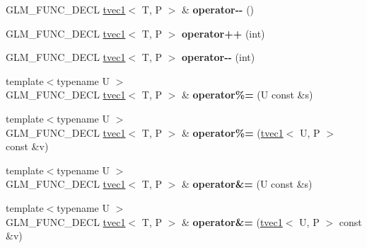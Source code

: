 \begin{DoxyCompactItemize}
\item 
G\+L\+M\+\_\+\+F\+U\+N\+C\+\_\+\+D\+E\+CL \hyperlink{structglm_1_1detail_1_1tvec1}{tvec1}$<$ T, P $>$ \& {\bfseries operator-\/-\/} ()\hypertarget{structglm_1_1detail_1_1tvec1_a777ac8b6fe013405c6015d518a2096a6}{}\label{structglm_1_1detail_1_1tvec1_a777ac8b6fe013405c6015d518a2096a6}

\item 
G\+L\+M\+\_\+\+F\+U\+N\+C\+\_\+\+D\+E\+CL \hyperlink{structglm_1_1detail_1_1tvec1}{tvec1}$<$ T, P $>$ {\bfseries operator++} (int)\hypertarget{structglm_1_1detail_1_1tvec1_a215f0e9af490b7cfce0639fc34e67df7}{}\label{structglm_1_1detail_1_1tvec1_a215f0e9af490b7cfce0639fc34e67df7}

\item 
G\+L\+M\+\_\+\+F\+U\+N\+C\+\_\+\+D\+E\+CL \hyperlink{structglm_1_1detail_1_1tvec1}{tvec1}$<$ T, P $>$ {\bfseries operator-\/-\/} (int)\hypertarget{structglm_1_1detail_1_1tvec1_a6fab4adec100e472d3b3d7da65ef2053}{}\label{structglm_1_1detail_1_1tvec1_a6fab4adec100e472d3b3d7da65ef2053}

\item 
{\footnotesize template$<$typename U $>$ }\\G\+L\+M\+\_\+\+F\+U\+N\+C\+\_\+\+D\+E\+CL \hyperlink{structglm_1_1detail_1_1tvec1}{tvec1}$<$ T, P $>$ \& {\bfseries operator\%=} (U const \&s)\hypertarget{structglm_1_1detail_1_1tvec1_a744a1362b6f4f9814ac695f7790b3fbf}{}\label{structglm_1_1detail_1_1tvec1_a744a1362b6f4f9814ac695f7790b3fbf}

\item 
{\footnotesize template$<$typename U $>$ }\\G\+L\+M\+\_\+\+F\+U\+N\+C\+\_\+\+D\+E\+CL \hyperlink{structglm_1_1detail_1_1tvec1}{tvec1}$<$ T, P $>$ \& {\bfseries operator\%=} (\hyperlink{structglm_1_1detail_1_1tvec1}{tvec1}$<$ U, P $>$ const \&v)\hypertarget{structglm_1_1detail_1_1tvec1_a99b8f92366abc26677caf3ad5befb4a2}{}\label{structglm_1_1detail_1_1tvec1_a99b8f92366abc26677caf3ad5befb4a2}

\item 
{\footnotesize template$<$typename U $>$ }\\G\+L\+M\+\_\+\+F\+U\+N\+C\+\_\+\+D\+E\+CL \hyperlink{structglm_1_1detail_1_1tvec1}{tvec1}$<$ T, P $>$ \& {\bfseries operator\&=} (U const \&s)\hypertarget{structglm_1_1detail_1_1tvec1_a641b0025753046a3c2b3c8020cf7d4aa}{}\label{structglm_1_1detail_1_1tvec1_a641b0025753046a3c2b3c8020cf7d4aa}

\item 
{\footnotesize template$<$typename U $>$ }\\G\+L\+M\+\_\+\+F\+U\+N\+C\+\_\+\+D\+E\+CL \hyperlink{structglm_1_1detail_1_1tvec1}{tvec1}$<$ T, P $>$ \& {\bfseries operator\&=} (\hyperlink{structglm_1_1detail_1_1tvec1}{tvec1}$<$ U, P $>$ const \&v)\hypertarget{structglm_1_1detail_1_1tvec1_ab765e86efc8cbb22c6a7d47a136cb64a}{}\label{structglm_1_1detail_1_1tvec1_ab765e86efc8cbb22c6a7d47a136cb64a}


\end{DoxyCompactItemize}
